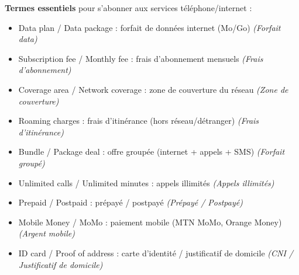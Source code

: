 \documentclass[11pt]{article}
\newcommand{\cle}[1]{{\popxbold\color{popdark}#1}}
\begin{document}
\begin{aretenir}
\textbf{Termes essentiels} pour s'abonner aux services téléphone/internet :
\begin{itemize}
\item \cle{Data plan} / \cle{Data package} : forfait de données internet (Mo/Go) \textit{(Forfait data)}
\item \cle{Subscription fee} / \cle{Monthly fee} : frais d'abonnement mensuels \textit{(Frais d'abonnement)}
\item \cle{Coverage area} / \cle{Network coverage} : zone de couverture du réseau \textit{(Zone de couverture)}
\item \cle{Roaming charges} : frais d'itinérance (hors réseau/détranger) \textit{(Frais d'itinérance)}
\item \cle{Bundle} / \cle{Package deal} : offre groupée (internet + appels + SMS) \textit{(Forfait groupé)}
\item \cle{Unlimited calls} / \cle{Unlimited minutes} : appels illimités \textit{(Appels illimités)}
\item \cle{Prepaid} / \cle{Postpaid} : prépayé / postpayé \textit{(Prépayé / Postpayé)}
\item \cle{Mobile Money} / \cle{MoMo} : paiement mobile (MTN MoMo, Orange Money) \textit{(Argent mobile)}
\item \cle{ID card} / \cle{Proof of address} : carte d'identité / justificatif de domicile \textit{(CNI / Justificatif de domicile)}
\end{itemize}
\end{aretenir}
\end{document}
